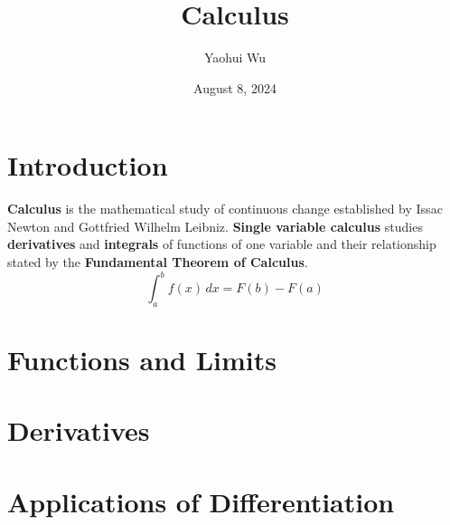 \documentclass[12pt]{article}
\title{Calculus}
\author{Yaohui Wu}
\date{August 8, 2024}
\begin{document}
\maketitle

\section*{Introduction}

\textbf{Calculus} is the mathematical study of continuous change established
by Issac Newton and Gottfried Wilhelm Leibniz.
\textbf{Single variable calculus} studies \textbf{derivatives} and
\textbf{integrals} of functions of one variable and their relationship stated
by the \textbf{Fundamental Theorem of Calculus}.
\[\int_a^b f(x)\,dx=F(b)-F(a)\]

\tableofcontents
\newpage

\section{Functions and Limits}







\section{Derivatives}













\section{Applications of Differentiation}







\end{document}
